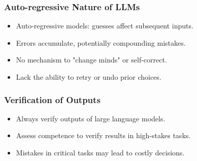 \begin{frame}[fragile]\frametitle{Auto-regressive Nature of LLMs}
  \begin{itemize}
    \item Auto-regressive models: guesses affect subsequent inputs.
    \item Errors accumulate, potentially compounding mistakes.
    \item No mechanism to "change minds" or self-correct.
    \item Lack the ability to retry or undo prior choices.
  \end{itemize}
\end{frame}

\begin{frame}[fragile]\frametitle{Verification of Outputs}
\begin{itemize}
    \item Always verify outputs of large language models.
    \item Assess competence to verify results in high-stakes tasks.
    \item Mistakes in critical tasks may lead to costly decisions.
\end{itemize}
\end{frame}



